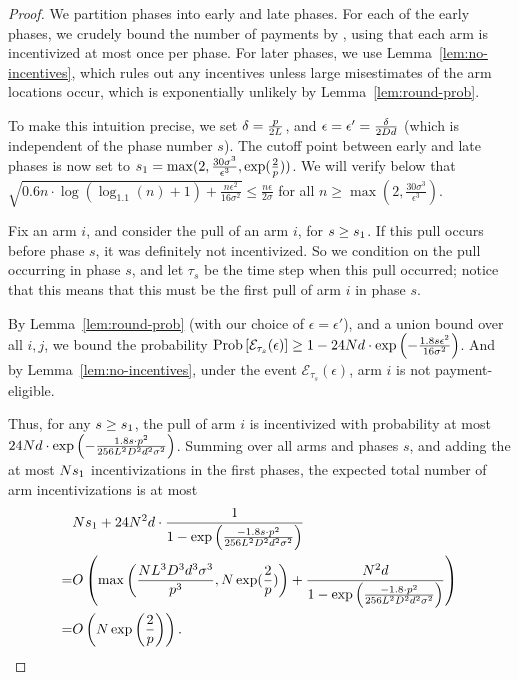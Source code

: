 \begin{proof}
We partition phases into early and late phases.
For each of the early phases,
we crudely bound the number of payments by \ARMNUM,
using that each arm is incentivized at most once per phase.
For later phases,
we use Lemma~\ref{lem:no-incentives},
which rules out any incentives unless large misestimates of the arm
locations occur, which is exponentially unlikely by 
Lemma~\ref{lem:round-prob}.

To make this intuition precise, we set
$\delta = \frac{p}{2 L}$,
and $\epsilon = \epsilon' = \frac{\delta}{2 D d}$
(which is independent of the phase number $s$).
The cutoff point between early and late phases is now set to
$s_1 = \max(2, \frac{30 \sigma^3}{\epsilon^3}, \exp(\frac{2}{p}))$.
We will verify below that
$\sqrt{0.6 n \cdot \log (\log_{1.1}(n) + 1) + \frac{n \epsilon^2}{16 \sigma^2}}
\leq \frac{n \epsilon}{2 \sigma}$
for all $n \geq \max(2, \frac{30 \sigma^3}{\epsilon^3})$.

Fix an arm $i$, and consider the  pull of an arm $i$,
for $s \geq s_1$.
If this pull occurs before phase $s$, it was definitely not incentivized.
So we condition on the pull occurring in phase $s$,
and let $\tau_s$ be the time step when this pull occurred;
notice that this means that this must be the first pull of arm $i$ in
phase $s$.

By Lemma~\ref{lem:round-prob} (with our choice of $\epsilon = \epsilon'$),
and a union bound over all $i,j$, we bound the probability
$\Prob{\AccEU{\tau_s}{\epsilon}}
\geq 1 - 24 \ARMNUM d \cdot \exp\left(-\frac{1.8 s \epsilon^2}{16 \sigma^2} \right)$.
And by Lemma~\ref{lem:no-incentives},
under the event ${\mathcal E}_{\tau_s}(\epsilon)$,
arm $i$ is not payment-eligible.

Thus, for any $s \geq s_1$,
the  pull of arm $i$ is incentivized  
with probability at most
$24 N d \cdot \exp \left(
  -\frac{1.8 s \cdot p^2}{256 L^2 D^2 d^2 \sigma^2}
\right)$.
Summing over all arms and phases $s$,
and adding the at most $N s_1$ incentivizations in
the first \EvenLaterPhase phases, 
the expected total number of arm incentivizations is at most
\begin{align*}
&N s_1
  + 24 N^2 d \cdot \frac{1}{1 - \exp \left(
    \frac{-1.8 s \cdot p^2}{256 L^2 D^2 d^2 \sigma^2}
  \right)} \nonumber \\
=& O\left( \max\left(\frac{N L^3 D^3 d^3 \sigma^3}{p^3}, N\exp(\frac{2}{p})\right)
  + \frac{N^2 d}{1 - \exp \left(
    \frac{-1.8 \cdot p^2}{256 L^2 D^2 d^2 \sigma^2}
  \right)} \right) \nonumber  \\
=& O\left( N\exp\left(\frac{2}{p}\right) \right).
\end{align*}


\end{proof}
